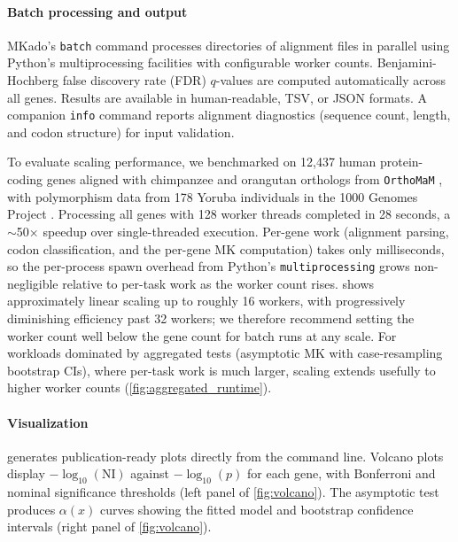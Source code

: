 \paragraph{Batch processing and output}
MKado's \texttt{batch} command processes directories of alignment files
in parallel using Python's multiprocessing facilities
with configurable worker counts.
Benjamini-Hochberg false discovery rate (FDR) $q$-values
are computed automatically across all genes.
Results are available in human-readable, TSV, or JSON formats.
A companion \texttt{info} command reports alignment diagnostics
(sequence count, length, and codon structure)
for input validation.

To evaluate scaling performance,
we benchmarked \mkado on 12,437 human protein-coding genes
aligned with chimpanzee and orangutan orthologs
from \texttt{OrthoMaM} \citep{orthomam2024},
with polymorphism data from 178 Yoruba individuals
in the 1000 Genomes Project \citep{1000genomes2015}.
Processing all genes with 128 worker threads
completed in 28 seconds, a $\sim$50$\times$ speedup over
single-threaded execution. Per-gene work
(alignment parsing, codon classification, and the per-gene MK
computation) takes only milliseconds, so the per-process spawn
overhead from Python's \texttt{multiprocessing} grows
non-negligible relative to per-task work as the worker count
rises.  shows approximately linear scaling
up to roughly 16 workers, with progressively diminishing
efficiency past 32 workers; we therefore recommend setting the
worker count well below the gene count for batch runs at any
scale. For workloads dominated by aggregated tests (asymptotic
MK with case-resampling bootstrap CIs), where per-task work is
much larger, scaling extends usefully to higher worker counts
(\cref{fig:aggregated_runtime}).

\paragraph{Visualization}
\mkado generates publication-ready plots
directly from the command line.
Volcano plots display $-\log_{10}(\text{NI})$
against $-\log_{10}(p)$ for each gene,
with Bonferroni and nominal significance thresholds
(left panel of \cref{fig:volcano}).
The asymptotic test produces $\alpha(x)$ curves
showing the fitted model and bootstrap confidence intervals
(right panel of \cref{fig:volcano}).

